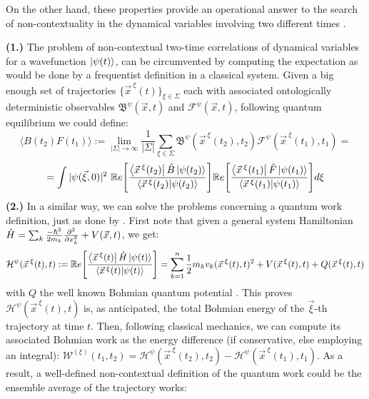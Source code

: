\documentclass[11pt, a4paper]{article} %
\newcommand{\B}{\mathfrak{B}}
\begin{document}
On the other hand, these properties provide an operational answer to the search of non-contextuality in the dynamical variables involving two different times \cite{DevInPosition1}. 

{\bf (1.)} The problem of non-contextual two-time correlations of dynamical variables for a wavefunction $\ket{\psi(t)}$, can be circumvented by computing the expectation as would be done by a frequentist definition in a classical system. Given a big enough set of trajectories $\{\vec{x}^{\:\xi}(t)\}_{\xi\in \Sigma}$ each with associated ontologically deterministic observables $\B^\psi(\vec{x},t)$ and $\mathcal{F}^\psi(\vec{x},t)$, following quantum equilibrium \cite{Absolute} we could define:\vspace{-0.2cm}
\begin{equation}
\langle B(t_2)F(t_1)\rangle := \lim_{|\Sigma|\rightarrow \infty}\frac{1}{|\Sigma|} \sum_{\xi\in\Sigma} \B^\psi(\vec{x}^{\:\xi}(t_2),t_2)\mathcal{F}^\psi(\vec{x}^{\:\xi}(t_1),t_1) =
\end{equation}
$$
=  \int |\psi(\vec{\xi},0)|^2\ \mathbb{R}e\qty[ \frac{\bra{\vec{x}^{\:\xi}(t_2)}\hat{B}\ket{\psi(t_2)}}{\bra{\vec{x}^{\:\xi}(t_2)}\ket{\psi(t_2)}} ] \mathbb{R}e\qty[ \frac{\bra{\vec{x}^{\:\xi}(t_1)}\hat{F}\ket{\psi(t_1)}}{\bra{\vec{x}^{\:\xi}(t_1)}\ket{\psi(t_1)}} ]d\xi
$$
{\bf (2.) } In a similar way, we can solve the problems concerning a quantum work definition, just as done by \cite{work1, work2}. First note that given a general system Hamiltonian $\hat{H}=\sum_k \frac{-\hbar^2}{2m_k}\pdv[2]{}{x_k}+V(\vec{x},t)$, we get:
\begin{equation}
\mathcal{H}^\psi(\vec{x}^{\:\xi}(t),t) := \mathbb{R}e\qty[ \frac{\bra{\vec{x}^{\:\xi}(t)}\hat{H}\ket{\psi(t)}}{\bra{\vec{x}^{\:\xi}(t)}\ket{\psi(t)}} ] = \sum_{k=1}^n\frac{1}{2}m_kv_k(\vec{x}^{\:\xi}(t),t)^2+V(\vec{x}^{\:\xi}(t),t)+Q(\vec{x}^{\:\xi}(t),t)
\end{equation}
with $Q$ the well known Bohmian quantum potential \cite{Holland, Durr, JordiXavier}. This proves $\mathcal{H}^\psi(\vec{x}^{\:\xi}(t),t)$ is, as anticipated, the total Bohmian energy of the $\vec{\xi}$-th trajectory at time $t$. Then, following classical mechanics, we can compute its associated Bohmian work as the energy difference (if conservative, else employing an integral): $\mathcal{W}^{(\xi)}(t_1,t_2)= \mathcal{H}^\psi(\vec{x}^{\:\xi}(t_2),t_2)-\mathcal{H}^\psi(\vec{x}^{\:\xi}(t_1),t_1)$. As a result, a well-defined non-contextual definition of the quantum work could be the ensemble average of the trajectory works:
\end{document}
